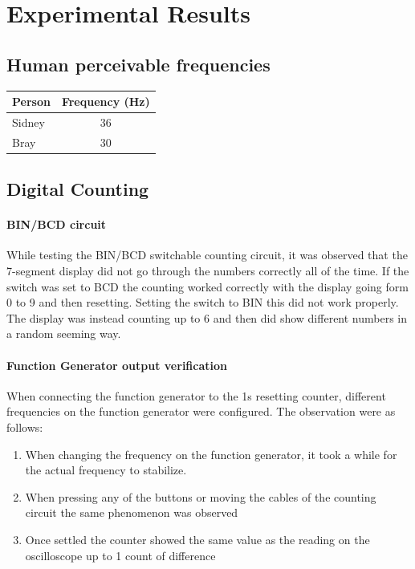 \documentclass[fleqn,14pt]{article}
\begin{document}
\section{Experimental Results}

\subsection{Human perceivable frequencies}

\vspace{0.5cm}
\begin{tabular}{lc}
  Person & Frequency (Hz)\\
  \midrule
  Sidney & 36\\
  Bray & 30\\
\end{tabular}
\vspace{0.5cm}

\subsection{Digital Counting}
\paragraph{BIN/BCD circuit}
While testing the BIN/BCD switchable counting circuit, it was observed that the 7-segment display did not
go through the numbers correctly all of the time. If the switch was set to BCD the counting worked correctly
with the display going form 0 to 9 and then resetting. Setting the switch to BIN this did not work properly.
The display was instead counting up to 6 and then did show different numbers in a random seeming way.

\paragraph{Function Generator output verification}
When connecting the function generator to the 1s resetting counter, different frequencies on
the function generator were configured. The observation were as follows:

\begin{enumerate}
  \item When changing the frequency on the function generator, it took a while for the actual frequency to stabilize.
  \item When pressing any of the buttons or moving the cables of the counting circuit the same phenomenon
  was observed
  \item Once settled the counter showed the same value as the reading on the oscilloscope up to 1 count
  of difference
\end{enumerate}
\end{document}
